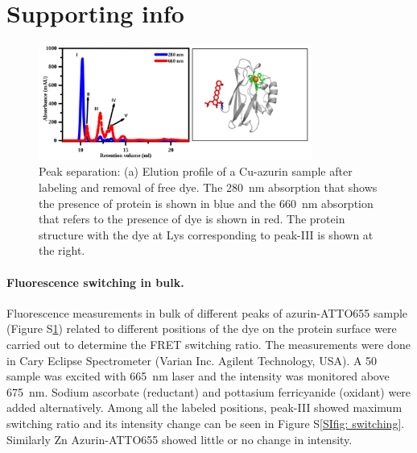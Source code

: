 \graphicspath{{chapters/c4_azurin_sm/si/}}
\section{Supporting info}
\begin{figure}[ht]
  \centering
  \includegraphics[width=0.8\textwidth]{peak_separation}
  \makeatletter
  \renewcommand{\fnum@figure}{\figurename~S\thefigure}
  \makeatother
  \caption{Peak separation: (a) Elution profile of a Cu-azurin sample after labeling and removal of free dye.
  The \SI{280}{\nm} absorption that shows the presence of protein is shown in blue and the \SI{660}{\nm} absorption that refers to the presence of dye is shown in red.
  The protein structure with the dye at Lys corresponding to peak-III is shown at the right. 
  }
  \label{SIfig: peak_sep}
\end{figure}
\paragraph*{Fluorescence switching in bulk.} Fluorescence measurements in bulk of different peaks of azurin-ATTO655 sample (Figure S\ref{SIfig: peak_sep}) related to different positions of the dye on the protein surface were carried out to determine the FRET switching ratio.
The measurements were done in Cary Eclipse Spectrometer (Varian Inc. Agilent Technology, USA).
A \SI{50}{\nM} sample was excited with \SI{665}{\nm} laser and the intensity was monitored above \SI{675}{\nm}.
Sodium ascorbate (reductant) and pottasium ferricyanide (oxidant) were added alternatively.
Among all the labeled positions, peak-III showed maximum switching ratio and its intensity change can be seen in Figure S\ref{SIfig: switching}.
Similarly Zn Azurin-ATTO655 showed little or no change in intensity.

